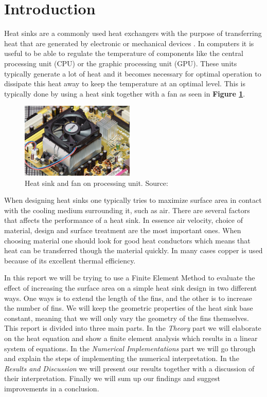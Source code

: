 \section{Introduction}
Heat sinks are a commonly used heat exchangers with the purpose of transferring heat that are generated by electronic or mechanical devices \cite{wiki_hs}. In computers it is useful to be able to regulate the temperature of components like the central processing unit (CPU) or the graphic processing unit	(GPU). These units typically generate a lot of heat and it becomes necessary for optimal operation to dissipate this heat away to keep the temperature at an optimal level. This is typically done by using a heat sink together with a fan as seen in \textbf{Figure \ref{fig:heatsink_and_fan}}. 

\begin{figure}
	\begin{center}
		\includegraphics[width=0.48\textwidth]{../figures/heatsink_and_fan.jpg}
	\end{center}
	\caption{Heat sink and fan on processing unit. Source: \cite{wiki_hs}}
    \label{fig:heatsink_and_fan}
\end{figure}

When designing heat sinks one typically tries to maximize surface area in contact with the cooling medium surrounding it, such as air. There are several factors that affects the performance of a heat sink. In essence air velocity, choice of material, design and surface treatment are the most important ones. When choosing material one should look for good heat conductors which means that heat can be transferred though the material quickly. In many cases copper is used because of its excellent thermal efficiency.

In this report we will be trying to use a Finite Element Method to evaluate the effect of increasing the surface area on a simple heat sink design in two different ways. One ways is to extend the length of the fins, and the other is to increase the number of fins. We will keep the geometric properties of the heat sink base constant, meaning that we will only vary the geometry of the fins themselves. This report is divided into three main parts. In the \textit{Theory} part we will elaborate on the heat equation and show a finite element analysis which results in a linear system of equations. In the \textit{Numerical Implementations} part we will go through and explain the steps of implementing the numerical interpretation. In the \textit{Results and Discussion} we will present our results together with a discussion of their interpretation. Finally we will sum up our findings and suggest improvements in a conclusion. %